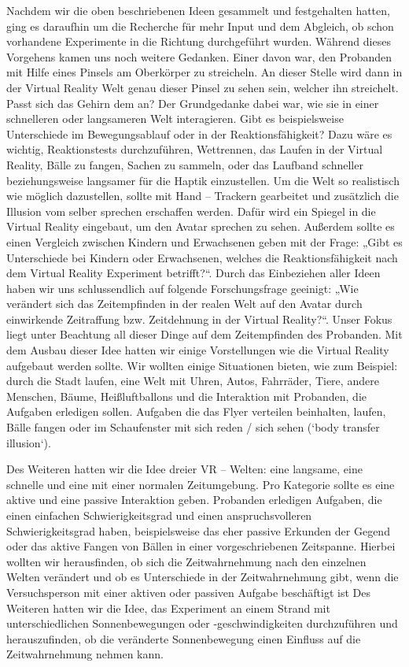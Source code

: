 \documentclass{Bericht}
\begin{document}
	Nachdem wir die oben beschriebenen Ideen gesammelt und festgehalten hatten, ging es daraufhin um die Recherche für mehr Input und dem Abgleich, ob schon vorhandene Experimente in die Richtung durchgeführt wurden. Während dieses Vorgehens kamen uns noch weitere Gedanken. Einer davon war, den Probanden mit Hilfe eines Pinsels am Oberkörper zu streicheln. An dieser Stelle wird dann in der Virtual Reality Welt genau dieser Pinsel zu sehen sein, welcher ihn streichelt. Passt sich das Gehirn dem an? Der Grundgedanke dabei war, wie sie in einer schnelleren oder langsameren Welt interagieren. Gibt es beispielsweise Unterschiede im Bewegungsablauf oder in der Reaktionsfähigkeit? Dazu wäre es wichtig, Reaktionstests durchzuführen, Wettrennen, das Laufen in der Virtual Reality, Bälle zu fangen, Sachen zu sammeln, oder das Laufband schneller beziehungsweise langsamer für die Haptik einzustellen. Um die Welt so realistisch wie möglich dazustellen, sollte mit Hand – Trackern gearbeitet und zusätzlich die Illusion vom selber sprechen erschaffen werden. Dafür wird ein Spiegel in die Virtual Reality eingebaut, um den Avatar sprechen zu sehen. Außerdem sollte es einen Vergleich zwischen Kindern und Erwachsenen geben mit der Frage: „Gibt es Unterschiede bei Kindern oder Erwachsenen, welches die Reaktionsfähigkeit nach dem Virtual Reality Experiment betrifft?“. Durch das Einbeziehen aller Ideen haben wir uns schlussendlich auf folgende Forschungsfrage geeinigt: „Wie verändert sich das Zeitempfinden in der realen Welt auf den Avatar durch einwirkende Zeitraffung bzw. Zeitdehnung in der Virtual Reality?“. Unser Fokus liegt unter Beachtung all dieser Dinge auf dem Zeitempfinden des Probanden. Mit dem Ausbau dieser Idee hatten wir einige Vorstellungen wie die Virtual Reality aufgebaut werden sollte. Wir wollten einige Situationen bieten, wie zum Beispiel: durch die Stadt laufen, eine Welt mit Uhren, Autos, Fahrräder, Tiere, andere Menschen, Bäume, Heißluftballons und die Interaktion mit Probanden, die Aufgaben erledigen sollen. Aufgaben die das Flyer verteilen beinhalten, laufen, Bälle fangen oder im Schaufenster mit sich reden / sich sehen (‘body transfer illusion‘).

	Des Weiteren hatten wir die Idee dreier VR – Welten: eine langsame, eine schnelle und eine mit einer normalen Zeitumgebung. Pro Kategorie sollte es eine aktive und eine passive Interaktion geben. Probanden erledigen Aufgaben, die einen einfachen Schwierigkeitsgrad und einen anspruchsvolleren Schwierigkeitsgrad haben, beispielsweise das eher passive Erkunden der Gegend oder das aktive Fangen von Bällen in einer vorgeschriebenen Zeitspanne. Hierbei wollten wir herausfinden, ob sich die Zeitwahrnehmung nach den einzelnen Welten verändert und ob es Unterschiede in der Zeitwahrnehmung gibt, wenn die Versuchsperson mit einer aktiven oder passiven Aufgabe beschäftigt ist  Des Weiteren hatten wir die Idee, das Experiment an einem Strand mit unterschiedlichen Sonnenbewegungen oder -geschwindigkeiten durchzuführen und herauszufinden, ob die veränderte Sonnenbewegung einen Einfluss auf die Zeitwahrnehmung nehmen kann. 
\end{document}
